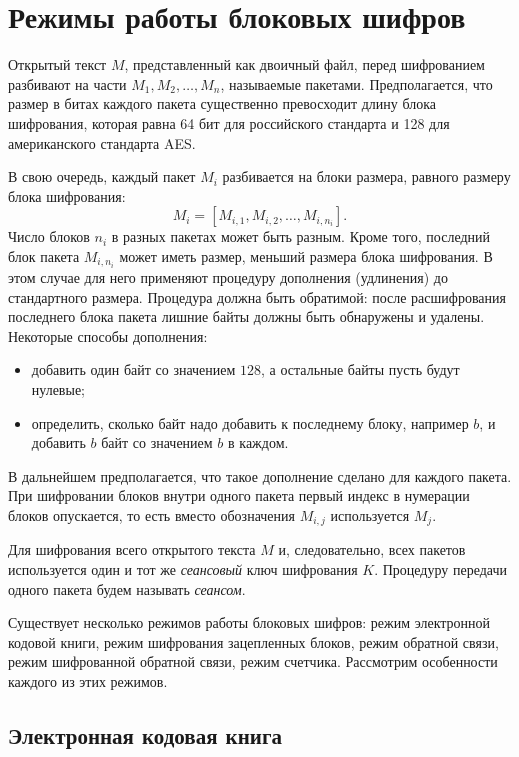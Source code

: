 \section{Режимы работы блоковых шифров}\label{chapter-block-chaining}

Открытый текст $M$, представленный как двоичный файл, перед шифрованием разбивают на части $M_1, M_2, \dots, M_n$, называемые пакетами. Предполагается, что размер в битах каждого пакета существенно превосходит длину блока шифрования, которая равна 64 бит для российского стандарта и 128 для американского стандарта AES.

В свою очередь, каждый пакет $M_i$ разбивается на блоки размера, равного размеру блока шифрования:
    \[ M_i = \left[ M_{i,1}, M_{i,2}, \dots, M_{i,n_i} \right]. \]
Число блоков $n_i$ в разных пакетах может быть разным. Кроме того, последний блок пакета $M_{i,n_i}$ может иметь размер, меньший размера блока шифрования. В этом случае для него применяют процедуру дополнения (удлинения) до стандартного размера. Процедура должна быть обратимой: после расшифрования последнего блока пакета лишние байты должны быть обнаружены и удалены. Некоторые способы дополнения:
\begin{itemize}
  \item добавить один байт со значением $128$, а остальные байты пусть будут нулевые;
  \item определить, сколько байт надо добавить к последнему блоку, например $b$, и добавить $b$ байт со значением $b$ в каждом.
\end{itemize}
В дальнейшем предполагается, что такое дополнение сделано для каждого пакета. При шифровании блоков внутри одного пакета первый индекс в нумерации блоков опускается, то есть вместо обозначения $M_{i,j}$ используется $M_j$.

Для шифрования всего открытого текста $M$ и, следовательно, всех пакетов используется один и тот же  \emph{сеансовый} ключ шифрования  $K$. Процедуру передачи одного пакета будем называть \emph{сеансом}.

Существует несколько режимов работы блоковых шифров: режим электронной кодовой книги, режим шифрования зацепленных блоков, режим обратной связи, режим шифрованной обратной связи, режим счетчика. Рассмотрим особенности каждого из этих режимов.


\subsection{Электронная кодовая книга}

